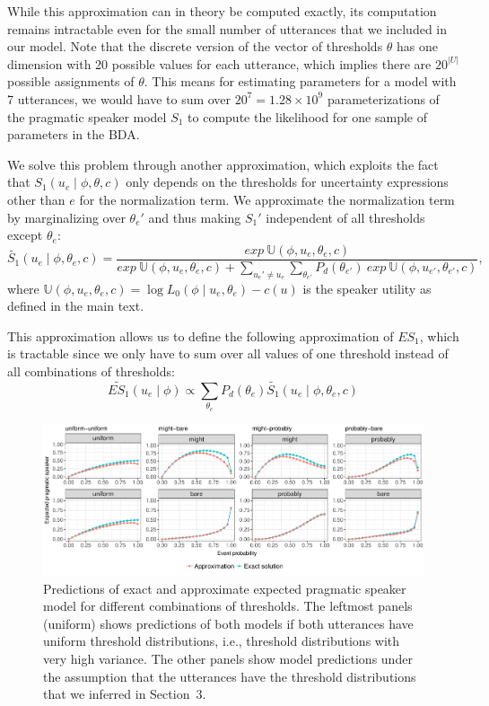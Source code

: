\documentclass[man, floatsintext]{apa6}
\begin{document}
While this approximation can in theory be computed exactly, its computation remains intractable even 
for the small number of utterances that we included in our model. Note that the discrete version of the
vector of thresholds $\theta$ has one dimension with 20 possible values for each utterance, which implies
there are $20^{|U|}$ possible assignments of $\theta$. This means for estimating parameters for 
a model with 7 utterances, we would have to sum over $20^{7}=1.28 \times 10^9$ 
parameterizations of the pragmatic speaker model $S_1$ to compute the likelihood for one 
sample of parameters in the BDA. 

We solve this problem through another approximation, which exploits the fact that 
$S_1(u _e \mid \phi, \theta, c)$ only depends on the thresholds for uncertainty
expressions other than $e$ for the normalization term. We approximate the normalization term by 
marginalizing over $\theta_e'$ and thus making $S_1'$ independent of all thresholds except $\theta_e$:
$$\widetilde{S_1}(u_e \mid \phi, \theta_e, c) = \frac{exp \ \mathbb{U}(\phi, u_e, \theta_e, c) } { exp \ \mathbb{U}(\phi, u_e, \theta_e, c) + 
\sum_{u_e' \ne u_e}{ \sum_{\theta_{e'}} P_d(\theta_{e'}) \  exp \ \mathbb{U}(\phi, u_{e'}, \theta_{e'}, c) } }, $$
where $\mathbb{U}(\phi, u_e, \theta_e, c) = \log L_0(\phi \mid u_e, \theta_e) - c(u) $ is the speaker utility as defined in the main text.



This approximation allows us to define the following approximation of $ES_1$, which is tractable since we only have to sum over
all values of one threshold instead of all combinations of thresholds:
$$\widetilde{ES_1}(u_e \mid \phi) \propto  \sum_{\theta_e} P_{d}(\theta_e) \widetilde{S_1}\left(u _e\mid \phi, \theta_e, c\right)$$

\begin{figure}[h!]
\includegraphics[width=\textwidth]{plots/approx-simulations.pdf}
\caption{Predictions of exact and approximate expected pragmatic speaker model for different combinations of thresholds. The leftmost panels (uniform) shows predictions of both models if both utterances have uniform threshold distributions, i.e., threshold distributions with very high variance. The other panels show model predictions under the assumption that the utterances have the threshold distributions that we inferred in Section~3. \label{fig:approx-simulations}}
\end{figure}
\end{document}
